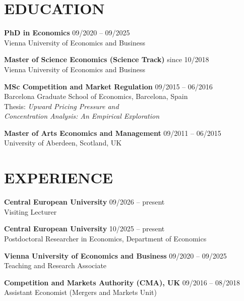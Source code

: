 \documentclass[margin]{res}
\begin{document}
\begin{resume}
\setlength{\parskip}{0.55\baselineskip}




\section{EDUCATION}
\textbf{PhD in Economics} \hfill 09/2020 -- 09/2025\\ Vienna University of Economics and Business 
\par
\textbf{Master of Science Economics (Science Track)} \hfill since 10/2018\\ Vienna University of Economics and Business 
\par
\textbf{MSc Competition and Market Regulation} \hfill 09/2015 -- 06/2016\\ Barcelona Graduate School of Economics, Barcelona, Spain
\\ Thesis: \textit{Upward Pricing Pressure and 
\\ Concentration Analysis: An Empirical Exploration}
\par
\textbf{Master of Arts Economics and Management} \hfill 09/2011 -- 06/2015\\ University of Aberdeen, Scotland, UK


\section{EXPERIENCE}
\textbf{Central European University} \hfill 09/2026 -- present\\ Visiting Lecturer
\par
\textbf{Central European University} \hfill 10/2025 -- present\\ Postdoctoral Researcher in Economics, Department of Economics
\par
\textbf{Vienna University of Economics and Business} \hfill 09/2020 -- 09/2025\\ Teaching and Research Associate
\par
\textbf{Competition and Markets Authority (CMA), UK} \hfill 09/2016 -- 08/2018\\ Assistant Economist (Mergers and Markets Unit)
\par


\end{resume}
\end{document}
